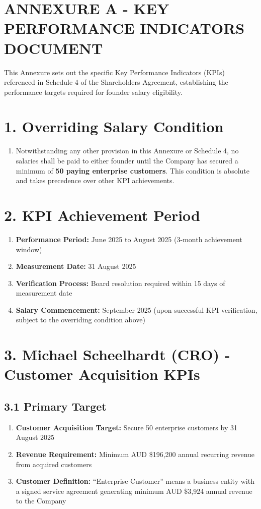\section*{ANNEXURE A - KEY PERFORMANCE INDICATORS DOCUMENT}

This Annexure sets out the specific Key Performance Indicators (KPIs) referenced in Schedule 4 of the Shareholders Agreement, establishing the performance targets required for founder salary eligibility.

\section*{1. Overriding Salary Condition}
\begin{enumerate}[label=\arabic*.]
\item Notwithstanding any other provision in this Annexure or Schedule 4, no salaries shall be paid to either founder until the Company has secured a minimum of \textbf{50 paying enterprise customers}. This condition is absolute and takes precedence over other KPI achievements.
\end{enumerate}

\section*{2. KPI Achievement Period}

\begin{enumerate}[label=\arabic*.]
\item \textbf{Performance Period:} June 2025 to August 2025 (3-month achievement window)
\item \textbf{Measurement Date:} 31 August 2025
\item \textbf{Verification Process:} Board resolution required within 15 days of measurement date
\item \textbf{Salary Commencement:} September 2025 (upon successful KPI verification, subject to the overriding condition above)
\end{enumerate}

\section*{3. Michael Scheelhardt (CRO) - Customer Acquisition KPIs}

\subsection*{3.1 Primary Target}
\begin{enumerate}[label=\arabic*.]
\item \textbf{Customer Acquisition Target:} Secure 50 enterprise customers by 31 August 2025
\item \textbf{Revenue Requirement:} Minimum AUD \$196,200 annual recurring revenue from acquired customers
\item \textbf{Customer Definition:} ``Enterprise Customer'' means a business entity with a signed service agreement generating minimum AUD \$3,924 annual revenue to the Company
\end{enumerate}

